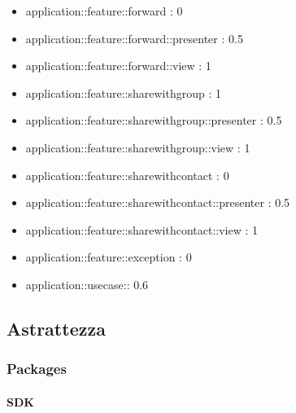 \begin{itemize}
\item application::feature::forward : 0
\item application::feature::forward::presenter : 0.5
\item application::feature::forward::view : 1
\item application::feature::sharewithgroup : 1
\item application::feature::sharewithgroup::presenter : 0.5
\item application::feature::sharewithgroup::view : 1
\item application::feature::sharewithcontact : 0
\item application::feature::sharewithcontact::presenter : 0.5
\item application::feature::sharewithcontact::view : 1
\item application::feature::exception : 0
\item application::usecase:: 0.6

\end{itemize}


\subsection{Astrattezza}

\subsubsection{Packages}

\paragraph{SDK}

